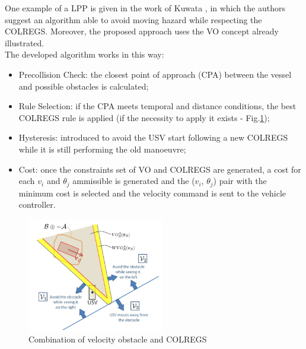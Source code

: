 \documentclass[12pt]{article}
\begin{document}
              One example of a LPP is given in the work of Kuwata \textcite{Kuwata2014}, in which the authors suggest an algorithm able to avoid moving hazard while respecting the COLREGS. Moreover, the proposed approach uses the VO concept already illustrated.\\
              The developed algorithm works in this way:
                    \begin{itemize}
                          \item Precollision Check: the closest point of approach (CPA) between the vessel and possible obstacles is calculated;
                          \item Rule Selection: if the CPA meets temporal and distance conditions, the best COLREGS rule is applied (if the necessity to apply it exists - Fig.\ref{fig:vo_colregs});
                          \item Hysteresis: introduced to avoid the USV start following a new COLREGS while it is still performing the old manoeuvre;
                          \item Cost: once the constraints set of VO and COLREGS are generated, a cost for each \textit{$v_i$} and \textit{$\theta_j$} ammissible is generated and the (\textit{$v_i$}, \textit{$\theta_j$}) pair with the minimum cost is selected and the velocity command is sent to the vehicle controller.
                    \end{itemize}

                    \begin{figure}
                          \centering
                          \includegraphics[height=5cm]{./Images/Kuwata/vo_colregs}
                          \caption{Combination of velocity obstacle and COLREGS}
                          \label{fig:vo_colregs}
                    \end{figure}
\end{document}
